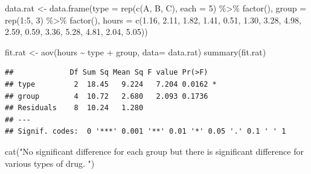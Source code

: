 \documentclass{article}
\newenvironment{Shaded}{\begin{snugshade}}{\end{snugshade}}
\newcommand{\AttributeTok}[1]{\textcolor[rgb]{0.77,0.63,0.00}{#1}}
\newcommand{\DecValTok}[1]{\textcolor[rgb]{0.00,0.00,0.81}{#1}}
\newcommand{\FloatTok}[1]{\textcolor[rgb]{0.00,0.00,0.81}{#1}}
\newcommand{\FunctionTok}[1]{\textcolor[rgb]{0.00,0.00,0.00}{#1}}
\newcommand{\NormalTok}[1]{#1}
\newcommand{\OtherTok}[1]{\textcolor[rgb]{0.56,0.35,0.01}{#1}}
\newcommand{\SpecialCharTok}[1]{\textcolor[rgb]{0.00,0.00,0.00}{#1}}
\newcommand{\StringTok}[1]{\textcolor[rgb]{0.31,0.60,0.02}{#1}}
\begin{document}
\begin{Shaded}
\begin{Highlighting}[]
\NormalTok{data.rat }\OtherTok{\textless{}{-}} \FunctionTok{data.frame}\NormalTok{(}\AttributeTok{type =} \FunctionTok{rep}\NormalTok{(}\FunctionTok{c}\NormalTok{(}\StringTok{\textquotesingle{}A\textquotesingle{}}\NormalTok{, }\StringTok{\textquotesingle{}B\textquotesingle{}}\NormalTok{, }\StringTok{\textquotesingle{}C\textquotesingle{}}\NormalTok{), }\AttributeTok{each =} \DecValTok{5}\NormalTok{) }\SpecialCharTok{\%\textgreater{}\%} \FunctionTok{factor}\NormalTok{(), }
                       \AttributeTok{group =} \FunctionTok{rep}\NormalTok{(}\DecValTok{1}\SpecialCharTok{:}\DecValTok{5}\NormalTok{, }\DecValTok{3}\NormalTok{) }\SpecialCharTok{\%\textgreater{}\%} \FunctionTok{factor}\NormalTok{(), }
                       \AttributeTok{hours =} \FunctionTok{c}\NormalTok{(}\FloatTok{1.16}\NormalTok{, }\FloatTok{2.11}\NormalTok{, }\FloatTok{1.82}\NormalTok{, }\FloatTok{1.41}\NormalTok{, }\FloatTok{0.51}\NormalTok{, }\FloatTok{1.30}\NormalTok{, }\FloatTok{3.28}\NormalTok{, }\FloatTok{4.98}\NormalTok{, }
                                 \FloatTok{2.59}\NormalTok{, }\FloatTok{0.59}\NormalTok{, }\FloatTok{3.36}\NormalTok{, }\FloatTok{5.28}\NormalTok{, }\FloatTok{4.81}\NormalTok{, }\FloatTok{2.04}\NormalTok{, }\FloatTok{5.05}\NormalTok{))}

\NormalTok{fit.rat }\OtherTok{\textless{}{-}} \FunctionTok{aov}\NormalTok{(hours }\SpecialCharTok{\textasciitilde{}}\NormalTok{ type }\SpecialCharTok{+}\NormalTok{ group, }\AttributeTok{data=}\NormalTok{ data.rat)}
\FunctionTok{summary}\NormalTok{(fit.rat)}
\end{Highlighting}
\end{Shaded}

\begin{verbatim}
##             Df Sum Sq Mean Sq F value Pr(>F)  
## type         2  18.45   9.224   7.204 0.0162 *
## group        4  10.72   2.680   2.093 0.1736  
## Residuals    8  10.24   1.280                 
## ---
## Signif. codes:  0 '***' 0.001 '**' 0.01 '*' 0.05 '.' 0.1 ' ' 1
\end{verbatim}

\begin{Shaded}
\begin{Highlighting}[]
\FunctionTok{cat}\NormalTok{(}\StringTok{"No significant difference for each group but there is significant }
\StringTok{    difference for various types of drug. "}\NormalTok{)}
\end{Highlighting}
\end{Shaded}
\end{document}

